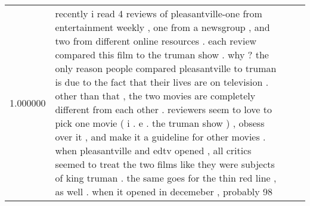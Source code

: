 \begin{tabular}{r{1cm} p{0.4in} r{1cm} p{0.4in}}
1.000000 & recently i read 4 reviews of pleasantville-one from entertainment weekly , one from a newsgroup , and two from different online resources .  each review compared this film to the truman show .  why ?  the only reason people compared pleasantville to truman is due to the fact that their lives are on television .  other than that , the two movies are completely different from each other .  reviewers seem to love to pick one movie ( i . e .  the truman show ) , obsess over it , and make it a guideline for other movies .  when pleasantville and edtv opened , all critics seemed to treat the two films like they were subjects of king truman .  the same goes for the thin red line , as well .  when it opened in decemeber , probably 98%
\end{tabular}
